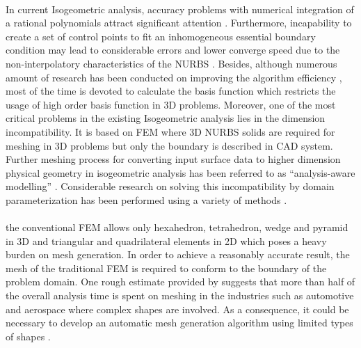 \paragraph{}
In current Isogeometric analysis, accuracy problems with numerical integration of a rational polynomials attract significant attention \citep{Hug2010,Sev2011,Aur2012}.
Furthermore, incapability to create a set of control points to fit an inhomogeneous essential boundary condition may lead to considerable errors and lower converge speed due to the non-interpolatory characteristics of the NURBS \citep{Wang2010,Wol2011,Koo2013}.
Besides, although numerous amount of research has been conducted on improving the algorithm efficiency \citep{Boo1972,Qin1996,Cho1990,Gra1992,Pan2001,Wang2012}, most of the time is devoted to calculate the basis function which restricts the usage of high order basis function in 3D problems.
Moreover, one of the most critical problems in the existing Isogeometric analysis lies in the dimension incompatibility.
It is based on FEM where 3D NURBS solids are required for meshing in 3D problems but only the boundary is described in CAD system.
Further meshing process for converting input surface data to higher dimension physical geometry in isogeometric analysis has been referred to as ``analysis-aware modelling'' \citep{Coh2010}.
Considerable research on solving this incompatibility by domain parameterization has been performed using a variety of methods \citep{Yang2007,Aig2009,Mar2009,Qian2011}.

\paragraph{}
the conventional FEM allows only hexahedron, tetrahedron, wedge and pyramid in 3D and triangular and quadrilateral elements in 2D which poses a heavy burden on mesh generation.
In order to achieve a reasonably accurate result, the mesh of the traditional FEM is required to conform to the boundary of the problem domain.
One rough estimate provided by \cite{Hug2005} suggests that more than half of the overall analysis time is spent on meshing in the industries such as automotive and aerospace where complex shapes are involved.
As a consequence, it could be necessary to develop an automatic mesh generation algorithm using limited types of shapes \citep{Frey:2007:MGA:1205626}.

